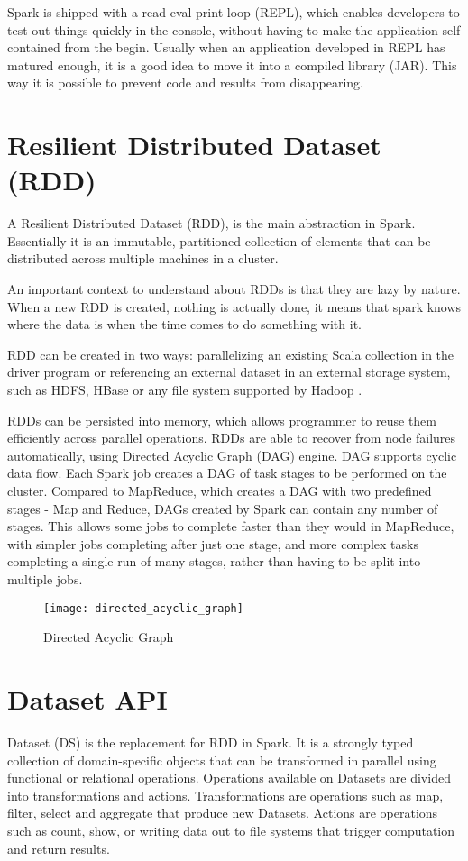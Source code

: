 \documentclass[main.tex]{thesis.tex}
\begin{document}
Spark is shipped with a read eval print loop (REPL), which enables developers to test out things quickly in the console, without having to make the application self contained from the begin.
Usually when an application developed in REPL has matured enough, it is a good idea to move it into a compiled library (JAR).
This way it is possible to prevent code and results from disappearing.

\section{Resilient Distributed Dataset (RDD)}

A Resilient Distributed Dataset (RDD), is the main abstraction in Spark.
Essentially it is an immutable, partitioned collection of elements that can be distributed across multiple machines in a cluster. \cite{spark-rdd}

An important context to understand about RDDs is that they are lazy by nature.
When a new RDD is created, nothing is actually done, it means that spark knows where the data is when the time comes to do something with it.

RDD can be created in two ways: parallelizing an existing Scala collection in the driver program or referencing an external dataset in an external storage system, such as HDFS, HBase or any file system supported by Hadoop \cite{spark-programming-guide}.

RDDs can be persisted into memory, which allows programmer to reuse them efficiently across parallel operations.
RDDs are able to recover from node failures automatically, using Directed Acyclic Graph (DAG) engine.
DAG supports cyclic data flow.
Each Spark job creates a DAG of task stages to be performed on the cluster.
Compared to MapReduce, which creates a DAG with two predefined stages - Map and Reduce, DAGs created by Spark can contain any number of stages.
This allows some jobs to complete faster than they would in MapReduce, with simpler jobs completing after just one stage, and more complex tasks completing a single run of many stages, rather than having to be split into multiple jobs. \cite{mapRSpark}

\begin{figure}[h]
	\caption{Directed Acyclic Graph \cite{dag-image}}
	\centering
	\texttt{[image: directed\_acyclic\_graph]}
\end{figure}

\section{Dataset API}
Dataset (DS) is the replacement for RDD in Spark.
It is a strongly typed collection of domain-specific objects that can be transformed in parallel using functional or relational operations.
Operations available on Datasets are divided into transformations and actions.
Transformations are operations such as map, filter, select and aggregate that produce new Datasets.
Actions are operations such as count, show, or writing data out to file systems that trigger computation and return results. \cite{spark-dataset}
\end{document}
